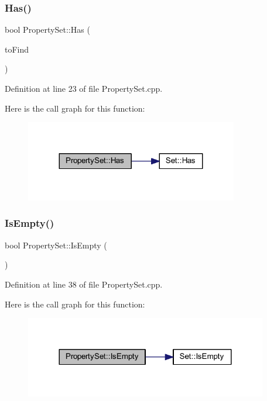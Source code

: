\subsubsection{\texorpdfstring{Has()}{Has()}}
{\footnotesize\ttfamily bool Property\+Set\+::\+Has (\begin{DoxyParamCaption}\item[{wx\+P\+G\+Property $\ast$}]{to\+Find }\end{DoxyParamCaption})}



Definition at line 23 of file Property\+Set.\+cpp.

Here is the call graph for this function\+:
\nopagebreak
\begin{figure}[H]
\begin{center}
\leavevmode
\includegraphics[width=263pt]{class_property_set_affec0e3a12cfab591a5ea8821244aa60_cgraph}
\end{center}
\end{figure}
\mbox{\label{class_property_set_a74caf43bdcc3717836a3130d6c3dad18}} 
\subsubsection{\texorpdfstring{Is\+Empty()}{IsEmpty()}}
{\footnotesize\ttfamily bool Property\+Set\+::\+Is\+Empty (\begin{DoxyParamCaption}{ }\end{DoxyParamCaption})}



Definition at line 38 of file Property\+Set.\+cpp.

Here is the call graph for this function\+:
\nopagebreak
\begin{figure}[H]
\begin{center}
\leavevmode
\includegraphics[width=300pt]{class_property_set_a74caf43bdcc3717836a3130d6c3dad18_cgraph}
\end{center}
\end{figure}
\mbox{\label{class_property_set_a388cd14ca61a4656e740b14831507108}} 
